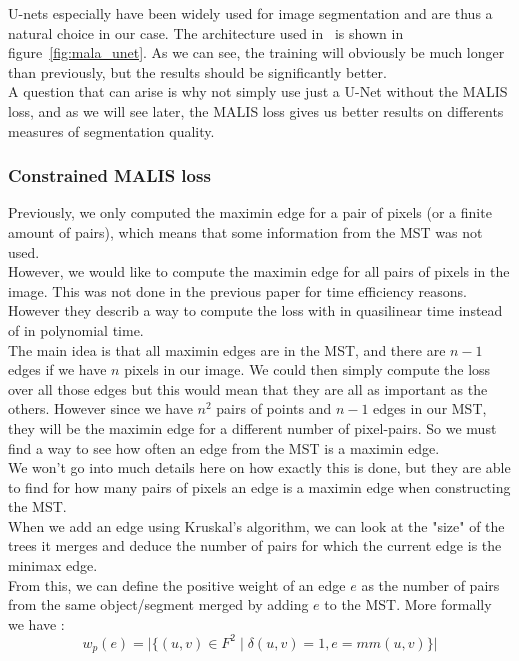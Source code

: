 U-nets especially have been widely used for image segmentation and are thus a
natural choice in our case. The architecture used in~\cite{funke_large_2019}
is shown in figure~\ref{fig:mala_unet}. As we can see, the training will
obviously be much longer than previously, but the results should be
significantly better.\\
A question that can arise is why not simply use just a U-Net without the MALIS
loss, and as we will see later, the MALIS loss gives us better results on
differents measures of segmentation quality.


\subsubsection{Constrained MALIS loss}

Previously, we only computed the maximin edge for a pair of pixels (or a finite
amount of pairs), which means that some information from the MST was not
used.\\
However, we would like to compute the maximin edge for all pairs of pixels in
the image. This was not done in the previous paper for time efficiency
reasons.\\
However they describ a way to compute the loss with in quasilinear time instead
of in polynomial time.\\

The main idea is that all maximin edges are in the MST, and there are $n-1$
edges if we have $n$ pixels in our image. We could then simply compute the loss
over all those edges but this would mean that they are all as important as the
others. However since we have $n^2$ pairs of points and $n-1$ edges in our MST,
they will be the maximin edge for a different number of pixel-pairs. So we must
find a way to see how often an edge from the MST is a maximin edge.\\

We won't go into much details here on how exactly this is done, but they are
able to find for how many pairs of pixels an edge is a maximin edge when
constructing the MST.\\
When we add an edge using Kruskal's algorithm, we can look at the "size" of the
trees it merges and deduce the number of pairs for which the current edge is
the minimax edge.\\

From this, we can define the positive weight of an edge $e$ as the number of pairs
from the same object/segment merged by adding $e$ to the MST. More formally we
have :
\begin{equation*}
	w_p(e)=\lvert \{(u,v)\in F^2 \;|\;\delta(u,v)=1, e=mm(u,v) \}   \rvert
\end{equation*}

